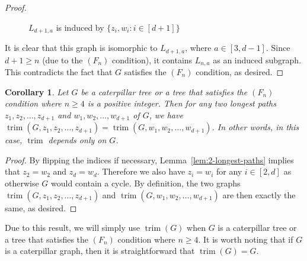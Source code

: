 \documentclass{amsart}
\newtheorem{corollary}[theorem]{Corollary}
\theoremstyle{remark}
\theoremstyle{definition}
\DeclareMathOperator{\trim}{trim}
\begin{document}
\begin{proof}
\begin{figure}[H]
\begin{center}
			\end{center}
			\caption{$L_{d+1,a}$ is induced by $\{z_i,w_i: i\in[d+1]\}$}
		\end{figure}
		
		It is clear that this graph is isomorphic to $L_{d+1,a}$, where $a\in [3,d-1]$. Since $d+1\geq n$ (due to the $(F_n)$ condition), it contains $L_{n,a}$ as an induced subgraph. This contradicts the fact that $G$ satisfies the $(F_n)$ condition, as desired.
	\end{proof}
	
	\begin{corollary}\label{cor:trim-well-defined}
		Let $G$ be a caterpillar tree or a tree that satisfies the $(F_n)$ condition where $n\geq 4$ is a positive integer. Then for any two longest paths $z_1,z_2,\dots, z_{d+1}$ and $w_1,w_2,\dots, w_{d+1}$ of $G$, we have $\trim(G,z_1,z_2,\dots, z_{d+1}) = \trim(G,w_1,w_2,\dots, w_{d+1})$. In other words, in this case, $\trim$ depends only on $G$. 
	\end{corollary}
	\begin{proof}
		By flipping the indices if necessary, Lemma~\ref{lem:2-longest-paths} implies that $z_2=w_2$ and $z_d=w_d$. Therefore we also have $z_i=w_i$ for any $i\in [2,d]$ as otherwise $G$ would contain a cycle. By definition, the two graphs $\trim(G,z_1,z_2,\dots, z_{d+1})$ and $\trim(G,w_1,w_2,\dots, w_{d+1})$ are then exactly the same, as desired.
	\end{proof}
	
	Due to this result, we will simply use $\trim(G)$ when $G$ is a caterpillar tree or a tree that satisfies the $(F_n)$ condition where $n\geq 4$. It is worth noting that if $G$ is a caterpillar graph, then it is straightforward that $\trim(G)=G$.
	
\end{document}
